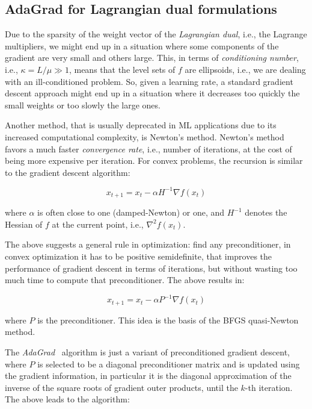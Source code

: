 \pagebreak

\subsection{AdaGrad for Lagrangian dual formulations}

Due to the sparsity of the weight vector of the \emph{Lagrangian dual}, i.e., the Lagrange multipliers, we might end up in a situation where some components of the gradient are very small and others large. This, in terms of \emph{conditioning number}, i.e., $\kappa = L/\mu \gg 1$, means that the level sets of $f$ are ellipsoids, i.e., we are dealing with an ill-conditioned problem. So, given a learning rate, a standard gradient descent approach might end up in a situation where it decreases too quickly the small weights or too slowly the large ones.

Another method, that is usually deprecated in ML applications due to its increased computational complexity, is Newton’s method. Newton’s method favors a much faster \emph{convergence rate}, i.e., number of iterations, at the cost of being more expensive per iteration. For convex problems, the recursion is similar to the gradient descent algorithm:

$$
x_{t+1} = x_t - \alpha H^{-1} \nabla f(x_t)
$$

where $\alpha$ is often close to one (damped-Newton) or one, and $H^{-1}$ denotes the Hessian of $f$ at the current point, i.e., $\nabla^2 f(x_t)$.

The above suggests a general rule in optimization: find any preconditioner, in convex optimization it has to be positive semidefinite, that improves the performance of gradient descent in terms of iterations, but without wasting too much time to compute that preconditioner. The above results in:

$$
x_{t+1} = x_t - \alpha P^{-1} \nabla f(x_t)
$$

where $P$ is the preconditioner. This idea is the basis of the BFGS quasi-Newton method.

The \emph{AdaGrad}~\cite{duchi2011adaptive} algorithm is just a variant of preconditioned gradient descent, where $P$ is selected to be a diagonal preconditioner matrix and is updated using the gradient information, in particular it is the diagonal approximation of the inverse of the square roots of gradient outer products, until the $k$-th iteration. The above leads to the algorithm:

